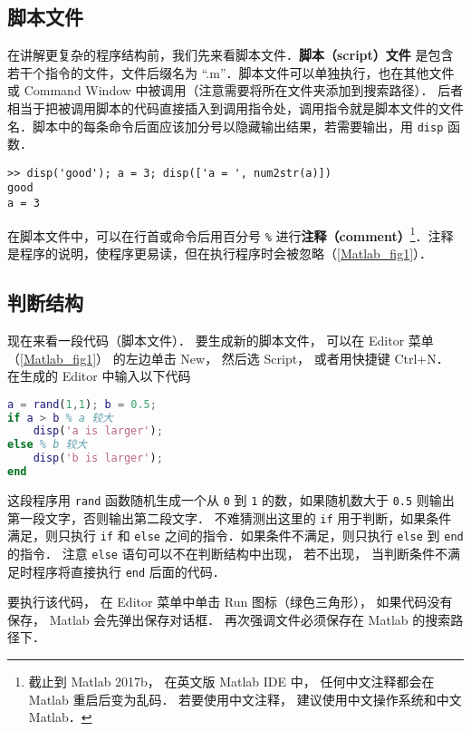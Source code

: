 

\subsection{脚本文件}
在讲解更复杂的程序结构前，我们先来看脚本文件．\textbf{脚本（script）文件} 是包含若干个指令的文件，文件后缀名为 “.m”．脚本文件可以单独执行，也在其他文件或 Command Window 中被调用（注意需要将所在文件夹添加到搜索路径）． 后者相当于把被调用脚本的代码直接插入到调用指令处，调用指令就是脚本文件的文件名．脚本中的每条命令后面应该加分号以隐藏输出结果，若需要输出，用 \verb|disp| 函数．
\begin{lstlisting}[language=matlabC]
>> disp('good'); a = 3; disp(['a = ', num2str(a)])
good
a = 3
\end{lstlisting}
在脚本文件中，可以在行首或命令后用百分号 \verb|%| 进行\textbf{注释（comment）}\footnote{截止到 Matlab 2017b， 在英文版 Matlab IDE 中， 任何中文注释都会在 Matlab 重启后变为乱码． 若要使用中文注释， 建议使用中文操作系统和中文 Matlab．}．注释是程序的说明，使程序更易读，但在执行程序时会被忽略（\autoref{Matlab_fig1}）．

\subsection{判断结构}
现在来看一段代码（脚本文件）． 要生成新的脚本文件， 可以在 Editor 菜单（\autoref{Matlab_fig1}） 的左边单击 New， 然后选 Script， 或者用快捷键 Ctrl+N． 在生成的 Editor 中输入以下代码

\begin{lstlisting}[language=matlab]
a = rand(1,1); b = 0.5;
if a > b % a 较大
    disp('a is larger');
else % b 较大
    disp('b is larger');
end
\end{lstlisting}

这段程序用 \verb|rand| 函数随机生成一个从 \verb|0| 到 \verb|1| 的数，如果随机数大于 \verb|0.5| 则输出第一段文字，否则输出第二段文字． 不难猜测出这里的 \verb|if| 用于判断，如果条件满足，则只执行 \verb|if| 和 \verb|else| 之间的指令．如果条件不满足，则只执行 \verb|else| 到 \verb|end| 的指令． 注意 \verb|else| 语句可以不在判断结构中出现， 若不出现， 当判断条件不满足时程序将直接执行 \verb|end| 后面的代码．

要执行该代码， 在 Editor 菜单中单击 Run 图标（绿色三角形）， 如果代码没有保存， Matlab 会先弹出保存对话框． 再次强调文件必须保存在 Matlab 的搜索路径下．

